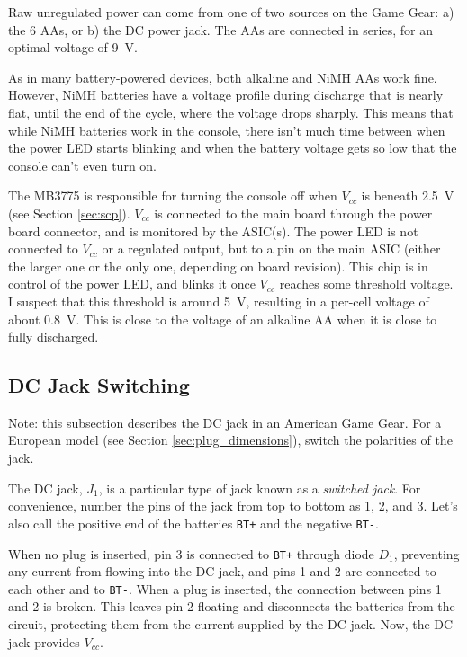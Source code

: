 \documentclass{article}
\newcommand{\Vcc}{$V_{cc}$}
\newcommand{\chippin}{\texttt}
\newcommand{\model}{\textsf}
\begin{document}
Raw unregulated power can come from one of two sources on the Game
Gear: a) the 6 AAs, or b) the DC power jack. The AAs are connected
in series, for an optimal voltage of \qty{9}{\volt}.

As in many battery-powered devices, both alkaline and NiMH AAs work
fine. However, NiMH batteries have a voltage profile during discharge
that is nearly flat, until the end of the cycle, where the voltage
drops sharply. This means that while NiMH batteries work in the
console, there isn't much time between when the power LED starts
blinking and when the battery voltage gets so low that the console
can't even turn on.

The \model{MB3775} is responsible for turning the console off when
\Vcc{} is beneath \qty{2.5}{\volt} (see Section \ref{sec:scp}). \Vcc{}
is connected to the main board through the power board connector, and
is monitored by the ASIC(s). The power LED is not connected to \Vcc{}
or a regulated output, but to a pin on the main ASIC (either the
larger one or the only one, depending on board revision). This chip is
in control of the power LED, and blinks it once \Vcc{} reaches some
threshold voltage. I suspect that this threshold is around
\qty{5}{\volt}, resulting in a per-cell voltage of about
\qty{0.8}{\volt}. This is close to the voltage of an alkaline AA when
it is close to fully discharged.

\subsection{DC Jack Switching}
Note: this subsection describes the DC jack in an American Game
Gear. For a European model (see Section \ref{sec:plug_dimensions}),
switch the polarities of the jack.

The DC jack, $J_1$, is a particular type of jack known as a
\textit{switched jack}. For convenience, number the pins of the jack
from top to bottom as 1, 2, and 3. Let's also call the positive end of
the batteries \chippin{BT+} and the negative \chippin{BT-}.

When no plug is inserted, pin 3 is connected to \chippin{BT+} through
diode $D_1$, preventing any current from flowing into the DC jack, and
pins 1 and 2 are connected to each other and to \chippin{BT-}. When a
plug is inserted, the connection between pins 1 and 2 is broken. This
leaves pin 2 floating and disconnects the batteries from the circuit,
protecting them from the current supplied by the DC jack. Now, the DC
jack provides \Vcc{}.
\end{document}
